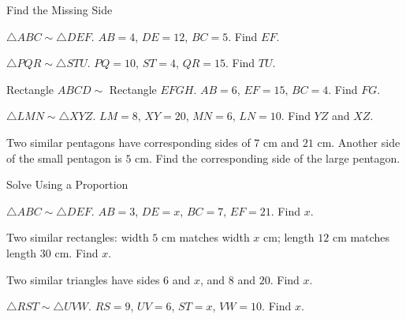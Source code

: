 \begin{practiceBox}{Find the Missing Side}


\prob $\triangle ABC \sim \triangle DEF$. $AB = 4$, $DE = 12$, $BC = 5$. Find $EF$. \answerBlank[3cm]

\prob $\triangle PQR \sim \triangle STU$. $PQ = 10$, $ST = 4$, $QR = 15$. Find $TU$. \answerBlank[3cm]

\prob Rectangle $ABCD \sim$ Rectangle $EFGH$. $AB = 6$, $EF = 15$, $BC = 4$. Find $FG$. \answerBlank[3cm]

\prob $\triangle LMN \sim \triangle XYZ$. $LM = 8$, $XY = 20$, $MN = 6$, $LN = 10$. Find $YZ$ and $XZ$. \answerBlank[3cm]

\prob Two similar pentagons have corresponding sides of $7$ cm and $21$ cm. Another side of the small pentagon is $5$ cm. Find the corresponding side of the large pentagon. \answerBlank[3cm]
\end{practiceBox}

\begin{practiceBox}[funTeal]{Solve Using a Proportion}


\prob $\triangle ABC \sim \triangle DEF$. $AB = 3$, $DE = x$, $BC = 7$, $EF = 21$. Find $x$. \answerBlank[3cm]

\prob Two similar rectangles: width $5$ cm matches width $x$ cm; length $12$ cm matches length $30$ cm. Find $x$. \answerBlank[3cm]

\prob Two similar triangles have sides $6$ and $x$, and $8$ and $20$. Find $x$. \answerBlank[3cm]

\prob $\triangle RST \sim \triangle UVW$. $RS = 9$, $UV = 6$, $ST = x$, $VW = 10$. Find $x$. \answerBlank[3cm]
\end{practiceBox}

